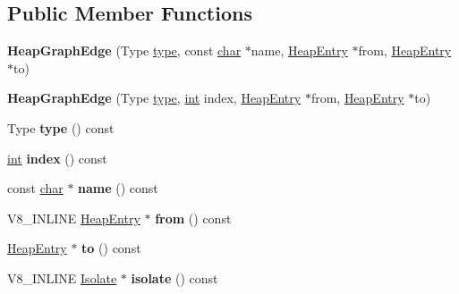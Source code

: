 \subsection*{Public Member Functions}
\begin{DoxyCompactItemize}
\item 
\mbox{\label{classv8_1_1internal_1_1HeapGraphEdge_abd9e96dbd3d4888ec2de0ad1068a8f7b}} 
{\bfseries Heap\+Graph\+Edge} (Type \mbox{\hyperlink{classstd_1_1conditional_1_1type}{type}}, const \mbox{\hyperlink{classchar}{char}} $\ast$name, \mbox{\hyperlink{classv8_1_1internal_1_1HeapEntry}{Heap\+Entry}} $\ast$from, \mbox{\hyperlink{classv8_1_1internal_1_1HeapEntry}{Heap\+Entry}} $\ast$to)
\item 
\mbox{\label{classv8_1_1internal_1_1HeapGraphEdge_aa054a62dc0e8a7b37eb22fe123a35204}} 
{\bfseries Heap\+Graph\+Edge} (Type \mbox{\hyperlink{classstd_1_1conditional_1_1type}{type}}, \mbox{\hyperlink{classint}{int}} index, \mbox{\hyperlink{classv8_1_1internal_1_1HeapEntry}{Heap\+Entry}} $\ast$from, \mbox{\hyperlink{classv8_1_1internal_1_1HeapEntry}{Heap\+Entry}} $\ast$to)
\item 
\mbox{\label{classv8_1_1internal_1_1HeapGraphEdge_a42af288ac335046f1009f35523527977}} 
Type {\bfseries type} () const
\item 
\mbox{\label{classv8_1_1internal_1_1HeapGraphEdge_a99ea6689bcb0b4820d2408a07f61b16a}} 
\mbox{\hyperlink{classint}{int}} {\bfseries index} () const
\item 
\mbox{\label{classv8_1_1internal_1_1HeapGraphEdge_a6b59a542835b6621ab3901ab508faf03}} 
const \mbox{\hyperlink{classchar}{char}} $\ast$ {\bfseries name} () const
\item 
\mbox{\label{classv8_1_1internal_1_1HeapGraphEdge_ad94884768c1d573ecb13232dce8dfd66}} 
V8\+\_\+\+I\+N\+L\+I\+NE \mbox{\hyperlink{classv8_1_1internal_1_1HeapEntry}{Heap\+Entry}} $\ast$ {\bfseries from} () const
\item 
\mbox{\label{classv8_1_1internal_1_1HeapGraphEdge_ac1e819d2d473a083e8eead99a24e764a}} 
\mbox{\hyperlink{classv8_1_1internal_1_1HeapEntry}{Heap\+Entry}} $\ast$ {\bfseries to} () const
\item 
\mbox{\label{classv8_1_1internal_1_1HeapGraphEdge_a9ca5ab009531a8bc5194b0b67d9c292b}} 
V8\+\_\+\+I\+N\+L\+I\+NE \mbox{\hyperlink{classv8_1_1internal_1_1Isolate}{Isolate}} $\ast$ {\bfseries isolate} () const
\end{DoxyCompactItemize}


